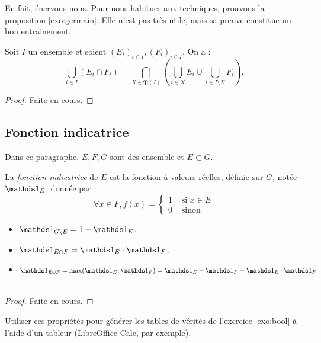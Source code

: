 En fait, énervons-nous. Pour nous habituer aux techniques, prouvons la proposition \ref{exo:germain}. Elle n'est pas très utile, mais sa preuve constitue un bon entrainement.
\begin{prop}\label{exo:germain}
    Soit $I$ un ensemble et soient $(E_i)_{i \in I}, (F_i)_{i \in I}$. On a :
    $$\bigcup_{i \in I}(E_i \cap F_i) = \bigcap_{X \in \mathfrak{P}(I)}\left(\bigcup_{i \in X} E_i \cup \bigcup_{i \in I \setminus X} F_i\right).$$
\end{prop}

\begin{proof}
    Faite en cours.
\end{proof}

\subsection{Fonction indicatrice}

Dans ce paragraphe, $E, F, G$ sont des ensemble et $E \subset G$.

\begin{dftn}
   La \emph{fonction indicatrice} de $E$ est la fonction à valeurs réelles, définie sur $G$, notée $\ind_E$, donnée par :
   $$\forall x \in F, f(x) = \left\{\begin{aligned}
    1& \textrm{ si } x \in E\\
    0& \textrm{ sinon}
   \end{aligned}\right.$$
\end{dftn}

\begin{prop}
    \begin{itemize}
        \item $\ind_{G \setminus E} = 1 - \ind_E$.
        \item $\ind_{E \cap F} = \ind_E\cdot\ind_F$.
        \item $\ind_{E \cup F} = \max(\ind_E, \ind_F) = \ind_E + \ind_F - \ind_E \cdot \ind_F$.
    \end{itemize}
\end{prop}

\begin{proof}
    Faite en cours.
\end{proof}

\begin{rlined}
    \begin{exo}
        Utiliser ces propriétés pour générer les tables de vérités de l'exercice \ref{exo:bool} à l'aide d'un tableur (LibreOffice Calc, par exemple).
    \end{exo}
\end{rlined}

